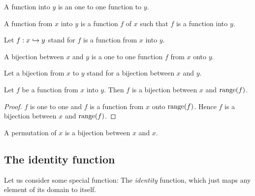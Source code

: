 \documentclass[../../set-theory.ftl.tex]{subfiles}
\begin{document}
\begin{forthel}
    \begin{definition}
      A function into $y$ is an one to one function to $y$.
    \end{definition}

    \begin{definition}
      A function from $x$ into $y$ is a function $f$ of $x$ such that $f$ is a function into $y$.
    \end{definition}

    Let $f: x \hookrightarrow y$ stand for $f$ is a function from $x$ into $y$.

    \begin{definition}
      A bijection between $x$ and $y$ is a one to one function $f$ from $x$ onto $y$.
    \end{definition}

    Let a bijection from $x$ to $y$ stand for a bijection between $x$ and $y$.

    \begin{proposition}\label{SetTheory_02_01_717927}
      Let $f$ be a function from $x$ into $y$.
      Then $f$ is a bijection between $x$ and $\operatorname{range}(f)$.
    \end{proposition}
    \begin{proof}
      $f$ is one to one and $f$ is a function from $x$ onto $\operatorname{range}(f)$.
      Hence $f$ is a bijection between $x$ and $\operatorname{range}(f)$.
    \end{proof}

    \begin{definition}
      A permutation of $x$ is a bijection between $x$ and $x$.
    \end{definition}
  \end{forthel}


  \subsection{The identity function}

  Let us consider some special function:
  The \textit{identity} function, which just maps any element of its domain to
  itself.
\end{document}
